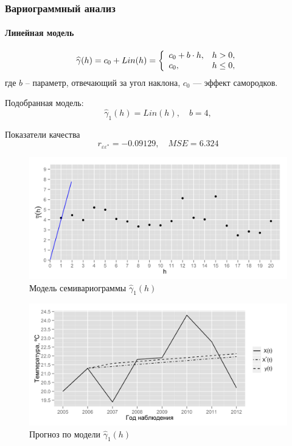 \documentclass{beamer}
\begin{document}
\begin{frame}
  \frametitle{Вариограммный анализ}
  \framesubtitle{Линейная модель}
  \begin{multicols}{2}
  \begin{equation}\begin{gathered}
  \label{eq:lin}
    \widehat{\gamma}(h) = c_0 + Lin(h) = \left\{
   \begin{array}{l l}
     c_0 + b \cdot h, & h > 0, \\
     c_0, & h \leq 0,
   \end{array} \right.
  \end{gathered}\end{equation}
  где $ b $ -- параметр, отвечающий за угол наклона, $ c_0 $ --- эффект самородков.

  \medskip

  Подобранная модель:
  \begin{equation}
  \label{eq:gamma1}
    \widehat{\gamma}_1(h) = Lin(h), \quad b = 4,
  \end{equation}

  Показатели качества
  \begin{equation*}
    r_{\varepsilon\varepsilon^{*}} = -0.09129, \quad MSE = 6.324
  \end{equation*}

  \columnbreak
  \vspace{-14.5pt}
  \begin{figure}[H]
    \includegraphics[width=0.9\linewidth]{../../figures/variogram/lin-modeled.png} \\
    \caption{Модель семивариограммы $\widehat{\gamma}_1(h)$}
    \includegraphics[width=0.9\linewidth]{../../figures/variogram/lin-cross-prediction.png}
    \caption{Прогноз по модели $\widehat{\gamma}_1(h)$}
  \end{figure}
  \end{multicols}
\end{frame}
\end{document}
